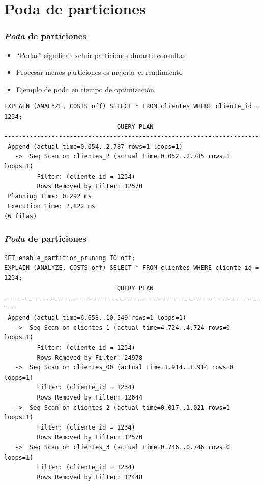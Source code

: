 \documentclass[ignorenonframetext,t]{beamer}
\begin{document}
\section{Poda de particiones}
\begin{frame}[fragile]
	\frametitle{\emph{Poda} de particiones}
	\begin{itemize}
		\item ``Podar'' significa excluir particiones durante consultas
		\item Procesar menos particiones es mejorar el rendimiento
		\item Ejemplo de poda en tiempo de optimización
	\end{itemize}

\begin{lstlisting}
EXPLAIN (ANALYZE, COSTS off) SELECT * FROM clientes WHERE cliente_id = 1234;
                               QUERY PLAN                               
----------------------------------------------------------------------
 Append (actual time=0.054..2.787 rows=1 loops=1)
   ->  Seq Scan on clientes_2 (actual time=0.052..2.785 rows=1 loops=1)
         Filter: (cliente_id = 1234)
         Rows Removed by Filter: 12570
 Planning Time: 0.292 ms
 Execution Time: 2.822 ms
(6 filas)
\end{lstlisting}
\end{frame}

\begin{frame}[fragile]
	\frametitle{\emph{Poda} de particiones}
	\begin{lstlisting}
SET enable_partition_pruning TO off;
EXPLAIN (ANALYZE, COSTS off) SELECT * FROM clientes WHERE cliente_id = 1234;
                               QUERY PLAN                                
-------------------------------------------------------------------------
 Append (actual time=6.658..10.549 rows=1 loops=1)
   ->  Seq Scan on clientes_1 (actual time=4.724..4.724 rows=0 loops=1)
         Filter: (cliente_id = 1234)
         Rows Removed by Filter: 24978
   ->  Seq Scan on clientes_00 (actual time=1.914..1.914 rows=0 loops=1)
         Filter: (cliente_id = 1234)
         Rows Removed by Filter: 12644
   ->  Seq Scan on clientes_2 (actual time=0.017..1.021 rows=1 loops=1)
         Filter: (cliente_id = 1234)
         Rows Removed by Filter: 12570
   ->  Seq Scan on clientes_3 (actual time=0.746..0.746 rows=0 loops=1)
         Filter: (cliente_id = 1234)
         Rows Removed by Filter: 12448
	\end{lstlisting}
\end{frame}
\end{document}
